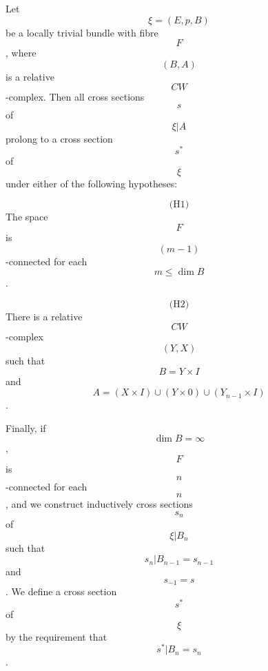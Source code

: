 Let $$\xi = (E, p, B)$$ be a locally trivial bundle with fibre $$F$$, where $$(B, A)$$ is a relative $$CW$$-complex. Then all cross sections $$s$$ of $$\xi|A$$ prolong to a cross section $$s^*$$ of $$\xi$$ under either of the following hypotheses:

$$\text{(H1)}$$ The space $$F$$ is $$(m - 1)$$-connected for each $$m \leq \dim B$$.

$$\text{(H2)}$$ There is a relative $$CW$$-complex $$(Y, X)$$ such that $$B = Y \times I$$ and $$A = (X \times I) \cup (Y \times 0) \cup (Y_{n-1} \times I)$$.

Finally, if $$\dim B = \infty$$, $$F$$ is $$n$$-connected for each $$n$$, and we construct inductively cross sections $$s_n$$ of $$\xi|B_n$$ such that $$s_n|B_{n-1} = s_{n-1}$$ and $$s_{-1} = s$$. We define a cross section $$s^*$$ of $$\xi$$ by the requirement that $$s^*|B_n = s_n$$.
